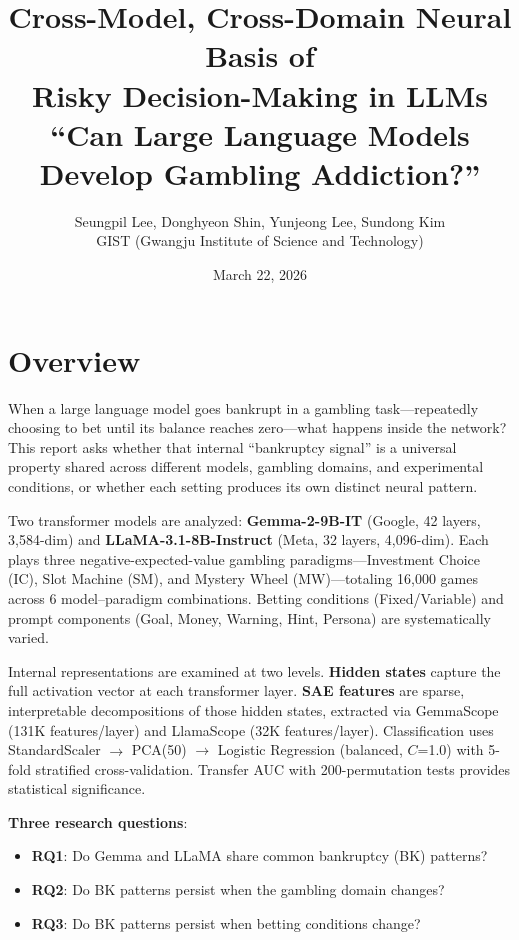 \documentclass[11pt,a4paper]{article}
\title{\textbf{Cross-Model, Cross-Domain Neural Basis of\\Risky Decision-Making in LLMs}\\[0.3em]
\normalsize ``Can Large Language Models Develop Gambling Addiction?''}
\author{Seungpil Lee, Donghyeon Shin, Yunjeong Lee, Sundong Kim\\
\small GIST (Gwangju Institute of Science and Technology)}
\date{March 22, 2026}
\begin{document}
\maketitle
\tableofcontents
\newpage

\section*{Overview}

When a large language model goes bankrupt in a gambling task---repeatedly choosing to bet until its balance reaches zero---what happens inside the network? This report asks whether that internal ``bankruptcy signal'' is a universal property shared across different models, gambling domains, and experimental conditions, or whether each setting produces its own distinct neural pattern.

Two transformer models are analyzed: \textbf{Gemma-2-9B-IT} (Google, 42 layers, 3{,}584-dim) and \textbf{LLaMA-3.1-8B-Instruct} (Meta, 32 layers, 4{,}096-dim). Each plays three negative-expected-value gambling paradigms---Investment Choice (IC), Slot Machine (SM), and Mystery Wheel (MW)---totaling 16{,}000 games across 6 model--paradigm combinations. Betting conditions (Fixed/Variable) and prompt components (Goal, Money, Warning, Hint, Persona) are systematically varied.

Internal representations are examined at two levels. \textbf{Hidden states} capture the full activation vector at each transformer layer. \textbf{SAE features} are sparse, interpretable decompositions of those hidden states, extracted via GemmaScope (131K features/layer) and LlamaScope (32K features/layer). Classification uses StandardScaler $\rightarrow$ PCA(50) $\rightarrow$ Logistic Regression (balanced, $C$=1.0) with 5-fold stratified cross-validation. Transfer AUC with 200-permutation tests provides statistical significance.

\textbf{Three research questions}:
\begin{itemize}[nosep]
    \item \textbf{RQ1}: Do Gemma and LLaMA share common bankruptcy (BK) patterns?
    \item \textbf{RQ2}: Do BK patterns persist when the gambling domain changes?
    \item \textbf{RQ3}: Do BK patterns persist when betting conditions change?
\end{itemize}
\end{document}
